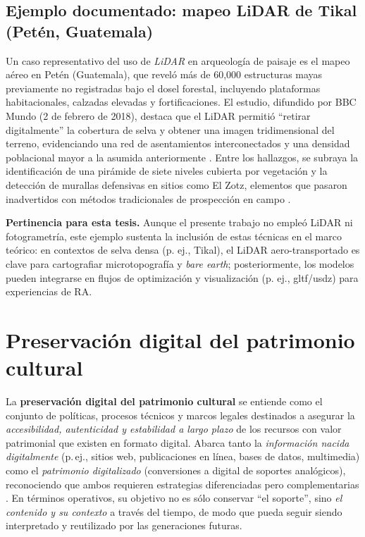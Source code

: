 \subsection*{Ejemplo documentado: mapeo LiDAR de Tikal (Petén, Guatemala)}

Un caso representativo del uso de \emph{LiDAR} en arqueología de paisaje es el mapeo aéreo en Petén (Guatemala), que reveló más de 60{,}000 estructuras mayas previamente no registradas bajo el dosel forestal, incluyendo plataformas habitacionales, calzadas elevadas y fortificaciones. El estudio, difundido por BBC Mundo (2 de febrero de 2018), destaca que el LiDAR permitió “retirar digitalmente” la cobertura de selva y obtener una imagen tridimensional del terreno, evidenciando una red de asentamientos interconectados y una densidad poblacional mayor a la asumida anteriormente \cite{BBCMundo2018Tikal}. Entre los hallazgos, se subraya la identificación de una pirámide de siete niveles cubierta por vegetación y la detección de murallas defensivas en sitios como El Zotz, elementos que pasaron inadvertidos con métodos tradicionales de prospección en campo \cite{BBCMundo2018Tikal}.

\textbf{Pertinencia para esta tesis.} Aunque el presente trabajo no empleó LiDAR ni fotogrametría, este ejemplo sustenta la inclusión de estas técnicas en el marco teórico: en contextos de selva densa (p. ej., Tikal), el LiDAR aero-transportado es clave para cartografiar microtopografía y \emph{bare earth}; posteriormente, los modelos pueden integrarse en flujos de optimización y visualización (p. ej., \gls{gltf}/\gls{usdz}) para experiencias de RA.



\section*{Preservación digital del patrimonio cultural}

La \textbf{preservación digital del patrimonio cultural} se entiende como el conjunto de políticas, procesos técnicos y marcos legales destinados a asegurar la \emph{accesibilidad, autenticidad y estabilidad a largo plazo} de los recursos con valor patrimonial que existen en formato digital. Abarca tanto la \emph{información nacida digitalmente} (p.\,ej., sitios web, publicaciones en línea, bases de datos, multimedia) como el \emph{patrimonio digitalizado} (conversiones a digital de soportes analógicos), reconociendo que ambos requieren estrategias diferenciadas pero complementarias \cite{Pabon2017}. En términos operativos, su objetivo no es sólo conservar “el soporte”, sino \emph{el contenido y su contexto} a través del tiempo, de modo que pueda seguir siendo interpretado y reutilizado por las generaciones futuras.

